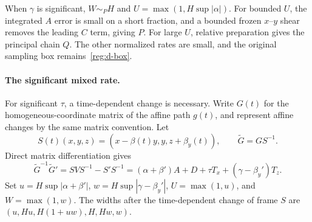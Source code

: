 \documentclass[11pt]{amsart}
\theoremstyle{definition}
\theoremstyle{remark}
\numberwithin{equation}{section}
\begin{document}
When $\gamma$ is significant, $W\sim_PH$ and $U=\max(1,H\sup|\alpha|)$. For bounded $U$, the integrated $A$ error is small on a short fraction, and a bounded frozen $x$--$y$ shear removes the leading $C$ term, giving $P$. For large $U$, relative preparation gives the principal chain $Q$. The other normalized rates are small, and the original sampling box remains~\eqref{reg:d-box}.

\paragraph{The significant mixed rate.}
For significant $\tau$, a time-dependent change is necessary. Write $G(t)$ for the homogeneous-coordinate matrix of the affine path $g(t)$, and represent affine changes by the same matrix convention. Let
\[
S(t)(x,y,z)=(x-\beta(t)y,y,z+\beta_y(t)),\qquad \widetilde G=GS^{-1}.
\]
Direct matrix differentiation gives
\begin{equation}\label{reg:d-gauge}
\widetilde G^{-1}\widetilde G'=SVS^{-1}-S'S^{-1}=(\alpha+\beta')A+D+\tau T_x+(\gamma-\beta_y')T_z.
\end{equation}
Set $u=H\sup|\alpha+\beta'|$, $w=H\sup|\gamma-\beta_y'|$, $U=\max(1,u)$, and $W=\max(1,w)$. The widths after the time-dependent change of frame $S$ are $(u,Hu,H(1+uw),H,Hw,w)$.
\end{document}
